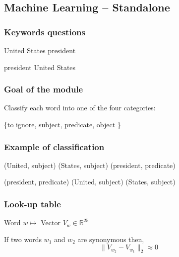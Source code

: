 \subsection{Machine Learning \--- Standalone}

\begin{frame}[fragile]
  \frametitle{Keywords questions}

	
	\begin{center}
  	United States president
	\end{center}

	\begin{center}
  	president United States
	\end{center}

\end{frame}

\begin{frame}[fragile]
\frametitle{Goal of the module}

\alert{Classify} each word into one of the four categories:

\begin{center}
 \{to ignore, subject, predicate, object \}
\end{center}

\end{frame}

\begin{frame}[fragile]
	\frametitle{Example of classification}

	\begin{center}
  	(United, subject) (States, subject) (president, predicate)
	\end{center}

	\begin{center}
  	(president, predicate) (United, subject) (States, subject)
	\end{center}



\end{frame}

\begin{frame}[fragile]
  \frametitle{Look-up table}

	\begin{center}
	Word $w \mapsto $ Vector $ V_w \in \mathbb{R}^{25}$
	\end{center}

	\begin{center}
	If two words $w_1$ and $w_2$ are synonymous then, \newline
	$$ \| V_{w_2} - V_{w_1} \|_2 \approx 0 $$
	
	\end{center}



\end{frame}



